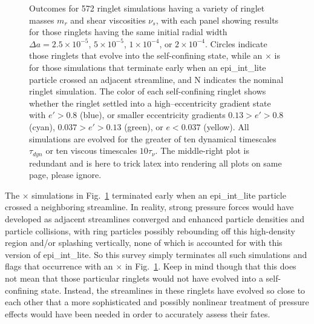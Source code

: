 \documentclass[preprint]{aastex62}
\begin{document}
\begin{figure}
    \caption{
        \label{fig:sim_grid_da}
        Outcomes for 572 ringlet simulations having a variety of ringlet
        masses $m_r$ and shear viscosities $\nu_s$, with each panel showing results
        for those ringlets having the same initial radial width
        $\Delta a=2.5\times10^{-5}$, $5\times10^{-5}$, $1\times10^{-4}$, or $2\times10^{-4}$. Circles 
        indicate those ringlets that evolve into the self-confining state, while an $\times$ is
        for those simulations that terminate early when an epi\_int\_lite particle crossed an adjacent streamline,
        and N indicates the nominal ringlet simulation. The color of each self-confining ringlet shows
        whether the ringlet settled into a high--eccentricity gradient state with $e'> 0.8$ (blue),
        or smaller eccentricity gradients $0.13> e'>0.8$ (cyan), $0.037> e'>0.13$ (green), or $e<0.037$ (yellow).
        All simulations are evolved for the greater of ten dynamical timescales $\tau_{dyn}$
        or ten viscous timescales $10\tau_{\nu}$.
        The middle-right plot is redundant and is here to trick latex into rendering all plots on same page, please ignore.
    }
\end{figure}

The $\times$ simulations in Fig.\ \ref{fig:sim_grid_da}
terminated early when an epi\_int\_lite particle crossed a 
neighboring streamline. In reality, strong 
pressure forces would have developed as adjacent streamlines converged
and enhanced particle densities and particle collisions, with ring particles
possibly rebounding off this high-density region and/or splashing vertically,
none of which is accounted for with this version of epi\_int\_lite. 
So this survey simply terminates all such simulations and flags that occurrence with an 
$\times$ in Fig.\ \ref{fig:sim_grid_da}. Keep in mind though that this does not mean
that those particular ringlets would not have evolved into a self-confining state. Instead,
the streamlines in these ringlets have evolved so close to each other that a more sophisticated
and possibly nonlinear treatment of pressure effects would have been needed in order  
to accurately assess their fates.
\end{document}
